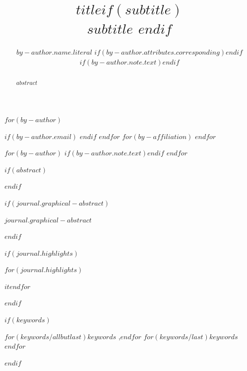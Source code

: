 
\begin{frontmatter}
\title{$title$$if(subtitle)$ \\\large{$subtitle$} $endif$}
$for(by-author)$\author[$for(by-author.affiliations)$$it.number$$sep$,$endfor$]{$by-author.name.literal$%
$if(by-author.attributes.corresponding)$$endif$%
$if(by-author.note.text)$$endif$}
$if(by-author.email)$  $endif$
$endfor$
$for(by-affiliation)$
$endfor$

$for(by-author)$
$if(by-author.note.text)$$endif$
$endfor$

$if(abstract)$
\begin{abstract}
$abstract$
\end{abstract}
$endif$

$if(journal.graphical-abstract)$\begin{graphicalabstract}
$journal.graphical-abstract$
\end{graphicalabstract}
$endif$

$if(journal.highlights)$\begin{highlights}
$for(journal.highlights)$\item $it$$endfor$
\end{highlights}
$endif$

$if(keywords)$
\begin{keyword}
    $for(keywords/allbutlast)$$keywords$ \sep $endfor$
    $for(keywords/last)$$keywords$$endfor$
\end{keyword}
$endif$
\end{frontmatter}

